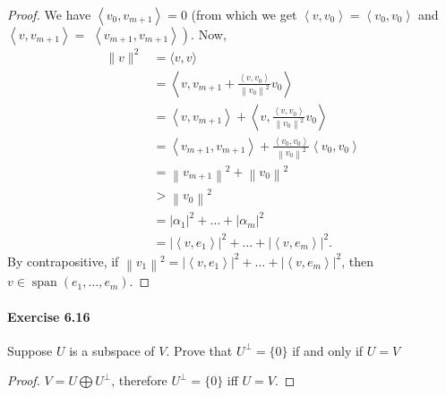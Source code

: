 \documentclass{article}
\theoremstyle{definition}
\begin{document}
\begin{proof}
We have $\left\langle v_0, v_{m+1}\right\rangle=0$ (from which we get $\left\langle v, v_0\right\rangle=\left\langle v_0, v_0\right\rangle$ and $\left\langle v, v_{m+1}\right\rangle=$ $\left.\left\langle v_{m+1}, v_{m+1}\right\rangle\right)$. Now,
$$
\begin{aligned}
\|v\|^2 & =\langle v, v\rangle \\
& =\left\langle v, v_{m+1}+\frac{\left\langle v, v_0\right\rangle}{\left\|v_0\right\|^2} v_0\right\rangle \\
& =\left\langle v, v_{m+1}\right\rangle+\left\langle v, \frac{\left\langle v, v_0\right\rangle}{\left\|v_0\right\|^2} v_0\right\rangle \\
& =\left\langle v_{m+1}, v_{m+1}\right\rangle+\frac{\left\langle v_0, v_0\right\rangle}{\left\|v_0\right\|^2}\left\langle v_0, v_0\right\rangle \\
& =\left\|v_{m+1}\right\|^2+\left\|v_0\right\|^2 \\
& >\left\|v_0\right\|^2 \\
& =\left|\alpha_1\right|^2+\ldots+\left|\alpha_m\right|^2 \\
& =\left|\left\langle v, e_1\right\rangle\right|^2+\ldots+\left|\left\langle v, e_m\right\rangle\right|^2 .
\end{aligned}
$$
By contrapositive, if $\left\|v_1\right\|^2=\left|\left\langle v, e_1\right\rangle\right|^2+\ldots+\left|\left\langle v, e_m\right\rangle\right|^2$, then $v \in \operatorname{span}\left(e_1, \ldots, e_m\right)$.
\end{proof}



\paragraph{Exercise 6.16} Suppose $U$ is a subspace of $V$. Prove that $U^{\perp}=\{0\}$ if and only if $U=V$
\begin{proof}
    $V=U \bigoplus U^{\perp}$, therefore $U^\perp = \{0\}$ iff $U=V$. 
\end{proof}
\end{document}
